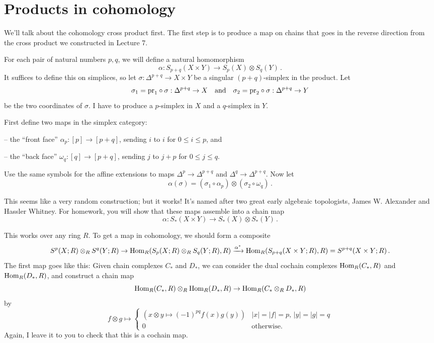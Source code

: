 \section{Products in cohomology}

We'll talk about the cohomology cross product first. The first
step is to produce a map on chains that goes in the reverse direction from
the cross product we constructed in Lecture 7. 

\begin{construction}
For each pair of natural numbers $p,q$, we will define a natural homomorphism 
\[
\alpha: S_{p+q}(X\times Y)\to S_p(X)\otimes S_q(Y)\,.
\]
It suffices to define this on simplices, so let 
$\sigma:\Delta^{p+q}\to X\times Y$ be a singular $(p+q)$-simplex in the product. Let 
\[
\sigma_1=\mathrm{pr}_1\circ\sigma:\Delta^{p+q}\to X\quad\hbox{and}\quad 
\sigma_2=\mathrm{pr}_2\circ\sigma:\Delta^{p+q}\to Y
\] 
be the two coordinates of $\sigma$. I have to produce
a $p$-simplex in $X$ and a $q$-simplex in $Y$.
 
First define two maps in the simplex category: 

\smallskip
-- the ``front face''  $\alpha_p:[p]\to[p+q]$, sending $i$ to $i$ for $0\leq i\leq p$, and

\smallskip
-- the ``back face'' $\omega_q:[q]\to[p+q]$, sending $j$ to $j+p$ for $0\leq j\leq q$. 

\smallskip\noindent
Use the same symbols for the affine 
extensions to maps $\Delta^p\to \Delta^{p+q}$ and $\Delta^q\to\Delta^{p+q}$. 
Now let 
\[
\alpha(\sigma)=(\sigma_1\circ\alpha_p)\otimes(\sigma_2\circ\omega_q)\,.
\]
\end{construction}
This seems like a very random construction; but it works! It's named after two
great early algebraic topologists, James W. Alexander and Hassler Whitney.
For homework, you will show that these maps assemble into a chain map
\[
\alpha:S_\ast(X\times Y)\to S_\ast(X)\otimes S_\ast(Y)\,.
\]

This works over any ring $R$. To get a map in cohomology, we should form
a composite 
\[
S^p(X;R)\otimes_RS^q(Y;R)\to
\operatorname{Hom}_R(S_p(X;R)\otimes_RS_q(Y;R),R)\xrightarrow{\alpha^*}
\operatorname{Hom}_R(S_{p+q}(X\times Y;R),R)=S^{p+q}(X\times Y;R)\,.
\]
The first map goes like this: Given chain complexes $C_\ast$ and $D_\ast$, 
we can consider the dual cochain complexes $\operatorname{Hom}_R(C_\ast,R)$ and
$\operatorname{Hom}_R(D_\ast,R)$, and construct a chain map 
\[
\operatorname{Hom}_R(C_\ast,R)\otimes_R\operatorname{Hom}_R(D_\ast,R)\to\operatorname{Hom}_R(C_\ast\otimes_R D_\ast,R)
\]
by 
\begin{equation*}
f\otimes g\mapsto\begin{cases}
(x\otimes y\mapsto (-1)^{pq}f(x)g(y)) & |x|=|f|=p,\, |y|=|g|=q\\
0 & \text{otherwise}.
\end{cases}
\end{equation*}
Again, I leave it to you to check that this is a cochain map. 

